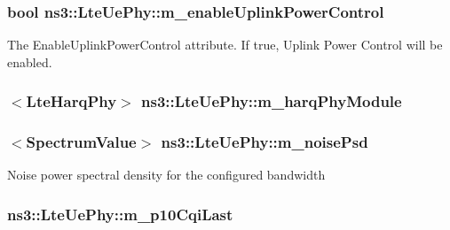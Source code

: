 \subsubsection[{\texorpdfstring{m\+\_\+enable\+Uplink\+Power\+Control}{m_enableUplinkPowerControl}}]{\setlength{\rightskip}{0pt plus 5cm}bool ns3\+::\+Lte\+Ue\+Phy\+::m\+\_\+enable\+Uplink\+Power\+Control\hspace{0.3cm}{\ttfamily [private]}}\hypertarget{classns3_1_1LteUePhy_a894d55731114732593b7d7eef8cb94b2}{}\label{classns3_1_1LteUePhy_a894d55731114732593b7d7eef8cb94b2}
The {\ttfamily Enable\+Uplink\+Power\+Control} attribute. If true, Uplink Power Control will be enabled. 
\subsubsection[{\texorpdfstring{m\+\_\+harq\+Phy\+Module}{m_harqPhyModule}}]{$<${\bf Lte\+Harq\+Phy}$>$ ns3\+::\+Lte\+Ue\+Phy\+::m\+\_\+harq\+Phy\+Module\hspace{0.3cm}{\ttfamily [private]}}\hypertarget{classns3_1_1LteUePhy_a9dcf48a436307726a8a1c6ce697983d8}{}\label{classns3_1_1LteUePhy_a9dcf48a436307726a8a1c6ce697983d8}
\subsubsection[{\texorpdfstring{m\+\_\+noise\+Psd}{m_noisePsd}}]{$<${\bf Spectrum\+Value}$>$ ns3\+::\+Lte\+Ue\+Phy\+::m\+\_\+noise\+Psd\hspace{0.3cm}{\ttfamily [private]}}\hypertarget{classns3_1_1LteUePhy_a527313b878e5c3103a76bedf25ea3f5c}{}\label{classns3_1_1LteUePhy_a527313b878e5c3103a76bedf25ea3f5c}
Noise power spectral density for the configured bandwidth 
\subsubsection[{\texorpdfstring{m\+\_\+p10\+Cqi\+Last}{m_p10CqiLast}}]{ ns3\+::\+Lte\+Ue\+Phy\+::m\+\_\+p10\+Cqi\+Last\hspace{0.3cm}{\ttfamily [private]}}\hypertarget{classns3_1_1LteUePhy_a360a0a07b343bf1370c5bd99d31dcd2a}{}\label{classns3_1_1LteUePhy_a360a0a07b343bf1370c5bd99d31dcd2a}
